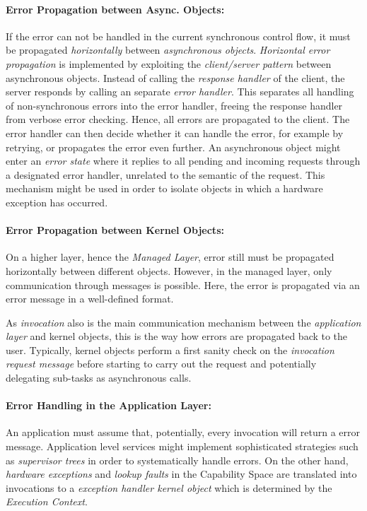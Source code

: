 \paragraph{Error Propagation between Async. Objects:}
If the error can not be handled in the current synchronous control flow, it must be propagated \emph{horizontally} between \emph{asynchronous objects}. 
\emph{Horizontal error propagation} is implemented by exploiting the \emph{client/server pattern}  between asynchronous objects. Instead of calling the \emph{response handler} of the client, the server responds by calling an separate \emph{error handler}. This separates all handling of non-synchronous errors into the error handler, freeing the response handler from verbose error checking. Hence, all errors are propagated to the client.
The error handler can then decide whether it can handle the error, for example by retrying, or propagates the error even further. An asynchronous object might enter an \emph{error state} where it replies to all pending and incoming requests through a designated error handler, unrelated to the semantic of the request. This mechanism might be used in order to isolate objects in which a hardware exception has occurred.

\paragraph{Error Propagation between Kernel Objects:}
On a higher layer, hence the \emph{Managed Layer}, error still must be propagated horizontally between different objects. However, in the managed layer, only communication through messages is possible. Here, the error is propagated via an error message in a well-defined format.

As \emph{invocation} also is the main communication mechanism between the \emph{application layer} and kernel objects, this is the way how errors are propagated back to the user.
Typically, kernel objects perform a first sanity check on the \emph{invocation request message} before starting to carry out the request and potentially delegating sub-tasks as asynchronous calls.

\paragraph{Error Handling in the Application Layer:}
\hspace{0em}
An application must assume that, potentially, every invocation will return a error message. Application level services might implement sophisticated strategies such as \emph{supervisor trees} \cite{Armstrong2003} in order to systematically handle errors.
On the other hand, \emph{hardware exceptions} and \emph{lookup faults} in the Capability Space are translated into invocations to a \emph{exception handler kernel object} which is determined by the \emph{Execution Context}.


